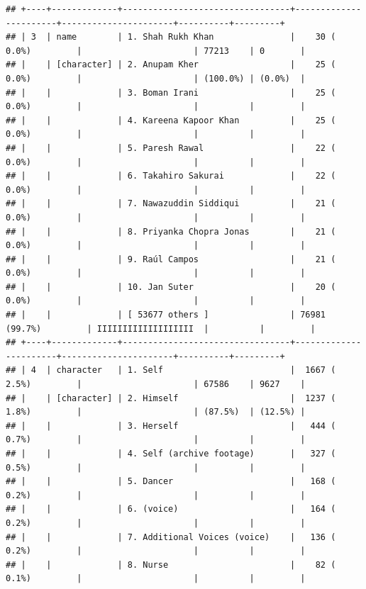 \documentclass[11pt,preprint]{elsarticle}
\numberwithin{equation}{section}
\numberwithin{figure}{section}
\numberwithin{table}{section}
\begin{document}
\begin{verbatim}
## +----+-------------+---------------------------------+-----------------------+----------------------+----------+---------+
## | 3  | name        | 1. Shah Rukh Khan               |    30 ( 0.0%)         |                      | 77213    | 0       |
## |    | [character] | 2. Anupam Kher                  |    25 ( 0.0%)         |                      | (100.0%) | (0.0%)  |
## |    |             | 3. Boman Irani                  |    25 ( 0.0%)         |                      |          |         |
## |    |             | 4. Kareena Kapoor Khan          |    25 ( 0.0%)         |                      |          |         |
## |    |             | 5. Paresh Rawal                 |    22 ( 0.0%)         |                      |          |         |
## |    |             | 6. Takahiro Sakurai             |    22 ( 0.0%)         |                      |          |         |
## |    |             | 7. Nawazuddin Siddiqui          |    21 ( 0.0%)         |                      |          |         |
## |    |             | 8. Priyanka Chopra Jonas        |    21 ( 0.0%)         |                      |          |         |
## |    |             | 9. Raúl Campos                  |    21 ( 0.0%)         |                      |          |         |
## |    |             | 10. Jan Suter                   |    20 ( 0.0%)         |                      |          |         |
## |    |             | [ 53677 others ]                | 76981 (99.7%)         | IIIIIIIIIIIIIIIIIII  |          |         |
## +----+-------------+---------------------------------+-----------------------+----------------------+----------+---------+
## | 4  | character   | 1. Self                         |  1667 ( 2.5%)         |                      | 67586    | 9627    |
## |    | [character] | 2. Himself                      |  1237 ( 1.8%)         |                      | (87.5%)  | (12.5%) |
## |    |             | 3. Herself                      |   444 ( 0.7%)         |                      |          |         |
## |    |             | 4. Self (archive footage)       |   327 ( 0.5%)         |                      |          |         |
## |    |             | 5. Dancer                       |   168 ( 0.2%)         |                      |          |         |
## |    |             | 6. (voice)                      |   164 ( 0.2%)         |                      |          |         |
## |    |             | 7. Additional Voices (voice)    |   136 ( 0.2%)         |                      |          |         |
## |    |             | 8. Nurse                        |    82 ( 0.1%)         |                      |          |         |

\end{verbatim}
\end{document}

